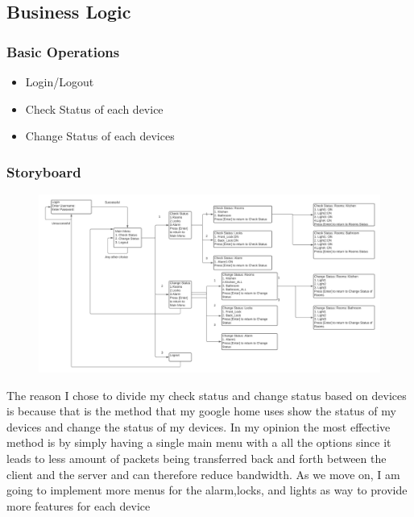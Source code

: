 \documentclass[11pt]{article}
\begin{document}
		\subsection{Business Logic}
			\subsubsection{Basic Operations}
				\begin{itemize}
					\item Login/Logout
					\item Check Status of each device
					\item Change Status of each devices
				\end{itemize}
			\subsubsection{Storyboard}
				\begin{figure}[H]
					\centering
					\includegraphics[scale=0.5]{StoryBoard}
					\caption{}
					\label{fig:storyboard}
				\end{figure}
			The reason I chose to divide my check status and change status  based on devices is because that is the method that my google home uses show the status of my devices and change the status of my devices. In my opinion the most effective method is by simply having a single main menu with a all the options since it leads to less amount of packets being transferred back and forth between the client and the server and can therefore reduce bandwidth.
			As we move on, I am going to implement more menus for the alarm,locks, and lights as way to provide more features for each device
\end{document}
